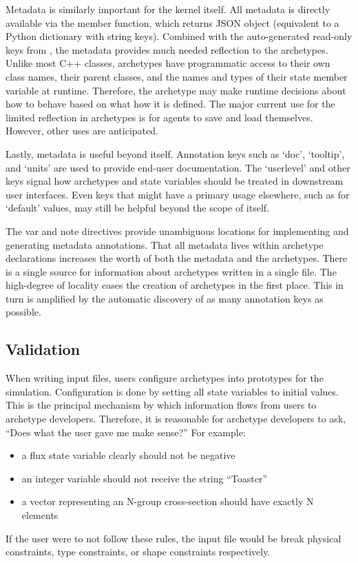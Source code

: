 Metadata is similarly important for the \cyclus kernel itself. All metadata is 
directly available via the  member function, which returns 
\gls{JSON} 
object (equivalent to a Python dictionary with string keys). Combined with the 
auto-generated read-only keys from \cycpp, the metadata provides much needed 
reflection to the archetypes.  Unlike most C++ classes, archetypes have 
programmatic access to their own class names, their parent classes, and the names and 
types of their state member variable at runtime. Therefore, the archetype may 
make runtime decisions about how to behave based on what how it is defined.
The major current use for the limited reflection in archetypes is for agents to 
save and load themselves. However, other uses are anticipated.

Lastly, metadata is useful beyond \cyclus itself. Annotation keys such as `doc',
`tooltip', and `units' are used to provide end-user documentation. The `userlevel'
and other keys signal how archetypes and state variables should be treated in 
downstream user interfaces.  Even keys that might have a primary usage elsewhere, 
such as for `default' values, may still be helpful beyond the scope of \cyclus 
itself.  

The var and note directives provide unambiguous locations for implementing and 
generating metadata annotations. That all metadata lives within archetype 
declarations increases the worth of both the metadata and the archetypes.
There is a single source for information about archetypes written in a single file.
The high-degree of locality eases the creation of archetypes in the first place.
This in turn is amplified by the automatic discovery of as many annotation 
keys as possible.

\subsection{Validation}

When writing \cyclus input files, users configure archetypes into prototypes 
for the simulation.  Configuration is done by setting all state variables to 
  initial values. This is the principal mechanism by which information flows 
  from users to archetype developers. Therefore, it is reasonable for archetype 
  developers to ask, ``Does what the user gave me make sense?'' For example: 

\begin{itemize} 
    \item a flux state variable clearly should not be negative
    \item an integer variable should not receive the string ``Toaster''
    \item a vector representing an N-group cross-section should have exactly N 
          elements
\end{itemize} 
If the user were to not follow these rules, the input file would be break physical
constraints, type constraints, or shape constraints respectively. 

